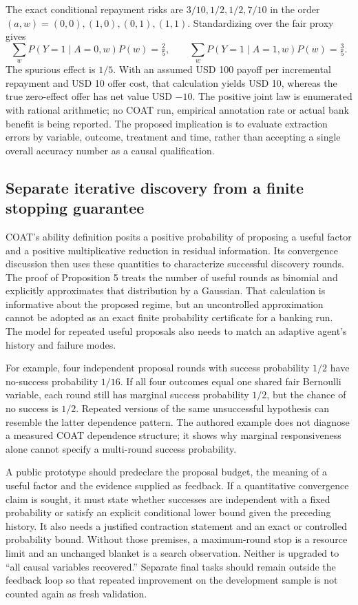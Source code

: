 The exact conditional repayment risks are $3/10,1/2,1/2,7/10$ in the order
$(a,w)=(0,0),(1,0),(0,1),(1,1)$. Standardizing over the fair proxy gives
\begin{equation}
 \sum_w P(Y=1\mid A=0,w)P(w)=\tfrac25,
 \qquad
 \sum_w P(Y=1\mid A=1,w)P(w)=\tfrac35.
 \label{exec19:coat-proxy-effect}
\end{equation}
The spurious effect is $1/5$. With an assumed USD 100 payoff per incremental
repayment and USD 10 offer cost, that calculation yields USD 10, whereas the
true zero-effect offer has net value USD $-10$. The positive joint law is
enumerated with rational arithmetic; no COAT run, empirical annotation rate
or actual bank benefit is being reported. The proposed implication is to
evaluate extraction errors by variable, outcome, treatment and time, rather
than accepting a single overall accuracy number as a causal qualification.
\citep{exec19_coat_reference}

\subsection{Separate iterative discovery from a finite stopping guarantee}
\label{exec19:coat-attempts}
COAT's ability definition posits a positive probability of proposing a useful
factor and a positive multiplicative reduction in residual information. Its
convergence discussion then uses these quantities to characterize successful
discovery rounds. The proof of Proposition 5 treats the number of useful rounds
as binomial and explicitly approximates that distribution by a Gaussian.
That calculation is informative about the proposed regime, but an
uncontrolled approximation cannot be adopted as an exact finite probability
certificate for a banking run. The model for repeated useful proposals also
needs to match an adaptive agent's history and failure modes.~\citep{exec19_coat}

For example, four independent proposal rounds with success probability $1/2$
have no-success probability $1/16$. If all four outcomes equal one shared
fair Bernoulli variable, each round still has marginal success probability
$1/2$, but the chance of no success is $1/2$. Repeated versions of the same
unsuccessful hypothesis can resemble the latter dependence pattern. The
authored example does not diagnose a measured COAT dependence structure; it
shows why marginal responsiveness alone cannot specify a multi-round success
probability.~\citep{exec19_coat_reference}

A public prototype should predeclare the proposal budget, the meaning of a
useful factor and the evidence supplied as feedback. If a quantitative
convergence claim is sought, it must state whether successes are independent
with a fixed probability or satisfy an explicit conditional lower bound given
the preceding history. It also needs a justified contraction statement and an
exact or controlled probability bound. Without those premises, a maximum-round
stop is a resource limit and an unchanged blanket is a search observation.
Neither is upgraded to ``all causal variables recovered.'' Separate final
tasks should remain outside the feedback loop so that repeated improvement on
the development sample is not counted again as fresh validation.

